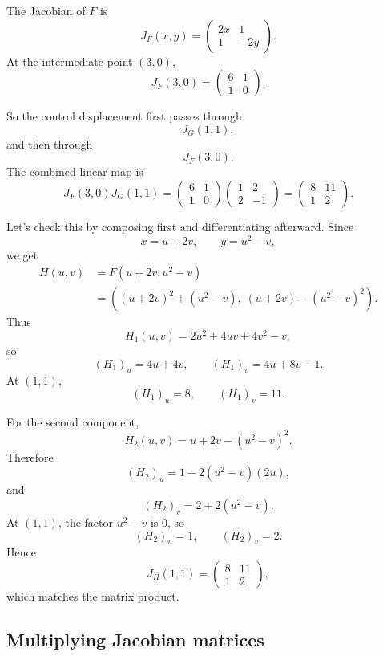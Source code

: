 The Jacobian of \(F\) is
\[
    J_F(x,y)
    =
    \begin{pmatrix}
        2x & 1\\
        1 & -2y
    \end{pmatrix}.
\]
At the intermediate point \((3,0)\),
\[
    J_F(3,0)
    =
    \begin{pmatrix}
        6 & 1\\
        1 & 0
    \end{pmatrix}.
\]

So the control displacement first passes through
\[
    J_G(1,1),
\]
and then through
\[
    J_F(3,0).
\]
The combined linear map is
\[
\boxed{
    J_F(3,0)J_G(1,1)
    =
    \begin{pmatrix}
        6 & 1\\
        1 & 0
    \end{pmatrix}
    \begin{pmatrix}
        1 & 2\\
        2 & -1
    \end{pmatrix}
    =
    \begin{pmatrix}
        8 & 11\\
        1 & 2
    \end{pmatrix}.
}
\]

Let's check this by composing first and differentiating afterward.  Since
\[
    x=u+2v,
    \qquad
    y=u^2-v,
\]
we get
\[
\begin{aligned}
H(u,v)
&=
F(u+2v,u^2-v)\\
&=
\left(
    (u+2v)^2+(u^2-v),\;
    (u+2v)-(u^2-v)^2
\right).
\end{aligned}
\]
Thus
\[
    H_1(u,v)=2u^2+4uv+4v^2-v,
\]
so
\[
    (H_1)_u=4u+4v,
    \qquad
    (H_1)_v=4u+8v-1.
\]
At \((1,1)\),
\[
    (H_1)_u=8,
    \qquad
    (H_1)_v=11.
\]

For the second component,
\[
    H_2(u,v)=u+2v-(u^2-v)^2.
\]
Therefore
\[
    (H_2)_u=1-2(u^2-v)(2u),
\]
and
\[
    (H_2)_v=2+2(u^2-v).
\]
At \((1,1)\), the factor \(u^2-v\) is \(0\), so
\[
    (H_2)_u=1,
    \qquad
    (H_2)_v=2.
\]
Hence
\[
    J_H(1,1)
    =
    \begin{pmatrix}
        8 & 11\\
        1 & 2
    \end{pmatrix},
\]
which matches the matrix product.

\subsection{Multiplying Jacobian matrices}

